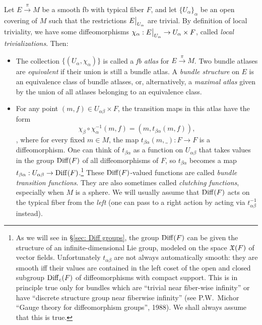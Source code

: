 \begin{defn}\label{def G-bundle}
    Let $E\overset{\pi}{\to}M$ be a smooth \gls{fb} with typical fiber $F$, and let $\{U_\alpha\}_\alpha$ be an open covering of $M$ such that the restrictions $\restr{E}{U_\alpha}$ are trivial. By definition of local triviality, we have some diffeomorphisms $\chi_\alpha: \restr{E}{U_\alpha}\to U_\alpha\times F$, called \emph{local trivializations}. Then:
\begin{itemize}

    \item The collection $\{(U_\alpha,\chi_\alpha)\}$ is called a \emph{\gls{fb} atlas} for $E\overset{\pi}{\to}M$. Two bundle atlases are \emph{equivalent} if their union is still a bundle atlas. A \emph{bundle structure} on $E$ is an equivalence class of bundle atlases, or, alternatively, a \emph{maximal atlas} given by the union of all atlases belonging to an equivalence class.
    
    \item For any point $(m,f)\in U_{\alpha\beta}\times F$, the transition maps in this atlas have the form \[\chi_\beta\circ\chi_\alpha^{-1} (m,f)=(m, t_{\beta\alpha}(m,f)),\label{eq transition functions}\], 
    where for every fixed $m\in M$, the map $t_{\beta\alpha}(m,\_):F\to F$ is a diffeomorphism. One can think of $t_{\beta\alpha}$ as a function on $U_{\alpha\beta}$ that takes values in the group $\operatorname{Diff}(F)$ of all diffeomorphisms of $F$, so $t_{\beta\alpha}$ becomes a map $t_{\beta\alpha}:U_{\alpha\beta}\to \operatorname{Diff}(F)$.\footnote{As we will see in \S\ref{sec: Diff groups}, the group $\operatorname{Diff}(F)$ can be given the structure of an infinite-dimensional Lie group, modeled on the space $\mathfrak{X}(F)$ of vector fields. Unfortunately $t_{\alpha\beta}$ are not always automatically smooth: they are smooth iff their values are contained in the left coset of the open and closed subgroup $\operatorname{Diff}_c(F)$ of diffeomorphisms with compact support. This is in principle true only for bundles which are ``trivial near fiber-wise infinity'' or have ``discrete structure group near fiberwise infinity'' (see P.W.~Michor ``Gauge theory for diffeomorphism groups'', 1988). We shall always assume that this is true.}
    These $\operatorname{Diff}(F)$-valued functions are called \emph{bundle transition functions}. They are also sometimes called \emph{clutching functions}, especially when $M$ is a sphere. We will usually assume that $\operatorname{Diff}(F)$ acts on the typical fiber from the \emph{left} (one can pass to a right action by acting via $t_{\alpha\beta}^{-1}$ instead).
    

\end{itemize}
\end{defn}

